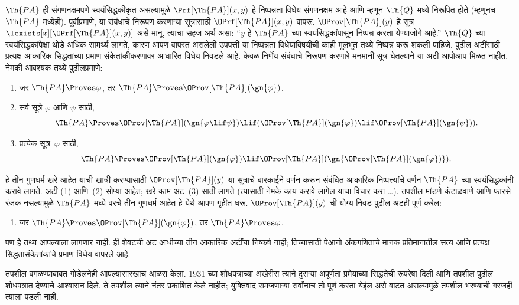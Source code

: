 $\Th{PA}$ ही संगणनक्षमपणे
स्वयंसिद्धकीकृत असल्यामुळे
$\Prf[\Th{PA}](x,y)$ हे
निष्पन्नता विधेय
संगणनक्षम आहे आणि म्हणून
$\Th{Q}$ मध्ये निरूपित
होते (म्हणूनच
$\Th{PA}$ मध्येही).
पूर्वीप्रमाणे, या संबंधाचे
निरूपण करणाऱ्या सूत्रासाठी
$\OPrf[\Th{PA}](x,y)$
वापरू. $\OProv[\Th{PA}](y)$
हे सूत्र
$\lexists[x][\OPrf[\Th{PA}](x,y)]$
असे मानू. त्याचा सहज
अर्थ असा: “$y$ हे
$\Th{PA}$ च्या स्वयंसिद्धकांपासून
निष्पन्न करता येण्याजोगे आहे.”
$\Th{Q}$ च्या स्वयंसिद्धकांपेक्षा
थोडे अधिक सामर्थ्य लागते,
कारण आपण वापरत असलेली
उपपत्ती या निष्पन्नता
विधेयाविषयीची काही मूलभूत
तथ्ये निष्पन्न करू शकली
पाहिजे. पुढील अटींसाठी प्रत्यक्ष आकारिक सिद्धतांच्या प्रमाण
संकेतांकीकरणावर आधारित विधेय निवडले आहे. केवळ निर्णेय
संबंधाचे निरूपण करणारे मनमानी सूत्र घेतल्याने या अटी
आपोआप मिळत नाहीत. नेमकी आवश्यक तथ्ये
पुढीलप्रमाणे:
\begin{enumerate}
\item[P1.] जर $\Th{PA} \Proves \varphi$, तर $\Th{PA} \Proves
  \OProv[\Th{PA}](\gn{\varphi})$.
\item[P2.] सर्व सूत्रे $\varphi$ आणि $\psi$ साठी,
  \[  \Th{PA} \Proves \OProv[\Th{PA}](\gn{\varphi \lif \psi}) \lif
  (\OProv[\Th{PA}](\gn{\varphi}) \lif \OProv[\Th{PA}](\gn{\psi})).
  \]
\item[P3.] प्रत्येक सूत्र~$\varphi$ साठी,
  \[  \Th{PA} \Proves \OProv[\Th{PA}](\gn{\varphi})
  \lif \OProv[\Th{PA}](\gn{\OProv[\Th{PA}](\gn{\varphi})}).
  \]
\end{enumerate}
हे तीन गुणधर्म खरे आहेत
याची खात्री करण्यासाठी
$\OProv[\Th{PA}](y)$
या सूत्राचे बारकाईने
वर्णन करून संबंधित आकारिक
निष्पत्त्यांचे वर्णन
$\Th{PA}$ च्या स्वयंसिद्धकांनी
करावे लागते. अटी (1) आणि~(2)
सोप्या आहेत; खरे काम
अट~(3) साठी लागते
(त्यासाठी नेमके काय
करावे लागेल याचा विचार करा
\dots). तपशील मांडणे
कंटाळवाणे आणि फारसे
रंजक नसल्यामुळे
$\Th{PA}$ मध्ये वरचे
तीन गुणधर्म आहेत हे
येथे आपण गृहीत धरू.
$\OProv[\Th{PA}](y)$
ची योग्य निवड पुढील
अटही पूर्ण करेल:
\begin{enumerate}
\item[P4.] जर $\Th{PA} \Proves \OProv[\Th{PA}](\gn{\varphi})$, तर
  $\Th{PA} \Proves \varphi$.
\end{enumerate}
पण हे तथ्य आपल्याला
लागणार नाही. ही शेवटची अट आधीच्या तीन आकारिक अटींचा
निष्कर्ष नाही; तिच्यासाठी पेआनो अंकगणिताचे मानक प्रतिमानातील
सत्य आणि प्रत्यक्ष सिद्धतासंकेतांकांचे प्रमाण विधेय वापरले आहे.

\begin{digress}
तपशील वगळण्याबाबत
गोडेलनेही आपल्यासारखाच
आळस केला. 1931 च्या
शोधपत्राच्या अखेरीस
त्याने दुसऱ्या अपूर्णता
प्रमेयाच्या सिद्धतेची
रूपरेषा दिली आणि
तपशील पुढील शोधपत्रात
देण्याचे आश्वासन दिले.
ते तपशील त्याने
नंतर प्रकाशित केले
नाहीत; युक्तिवाद समजणाऱ्या
सर्वांनाच तो पूर्ण करता
येईल असे वाटत असल्यामुळे
तपशील भरण्याची गरजही
त्याला पडली नाही.
\end{digress}













